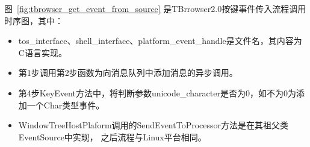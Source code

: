 \documentclass[12pt]{article}
\begin{document}
图~\ref{fig:tbrowser_get_event_from_source}
是TBrrowser2.0按键事件传入流程调用时序图，其中：
\begin{itemize}
  \item tos\_interface、shell\_interface、platform\_event\_handle是文件名，其内容为C语言实现。
  \item 第1步调用第2步函数为向消息队列中添加消息的异步调用。
  \item 第4步KeyEvent方法中，将判断参数unicode\_character是否为0，如不为0为添加一个Char类型事件。
  \item WindowTreeHostPlaform调用的SendEventToProcessor方法是在其祖父类EventSource中实现，
  之后流程与Linux平台相同。
\end{itemize}

\begin{spacing}{1.0}
\begin{lstlisting}[language={C++}]

\end{lstlisting}
\end{spacing}
\end{document}
